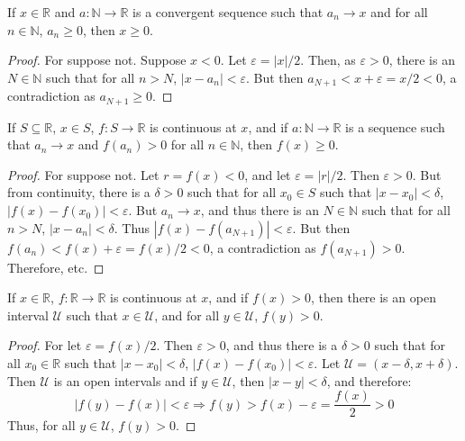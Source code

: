     \begin{theorem}
        If $x\in\mathbb{R}$ and $a:\mathbb{N}\rightarrow\mathbb{R}$ is a
        convergent sequence such that $a_{n}\rightarrow{x}$ and for all
        $n\in\mathbb{N}$, $a_{n}\geq{0}$, then $x\geq{0}$.
    \end{theorem}
    \begin{proof}
        For suppose not. Suppose $x<0$. Let $\varepsilon=|x|/2$. Then, as
        $\varepsilon>0$, there is an $N\in\mathbb{N}$ such that for all $n>N$,
        $|x-a_{n}|<\varepsilon$. But then $a_{N+1}<x+\varepsilon=x/2<0$, a
        contradiction as $a_{N+1}\geq{0}$.
    \end{proof}
    \begin{theorem}
        \label{thm:Continuous_Limit_of_Pos_Sequ_is_nonneg}
        If $S\subseteq\mathbb{R}$, $x\in{S}$, $f:S\rightarrow\mathbb{R}$ is
        continuous at $x$, and if $a:\mathbb{N}\rightarrow\mathbb{R}$ is a
        sequence such that  $a_{n}\rightarrow{x}$ and $f(a_{n})>0$
        for all $n\in\mathbb{N}$, then $f(x)\geq{0}$.
    \end{theorem}
    \begin{proof}
        For suppose not. Let $r=f(x)<0$, and let $\varepsilon=|r|/2$. Then
        $\varepsilon>0$. But from continuity, there is a $\delta>0$ such that
        for all $x_{0}\in{S}$ such that $|x-x_{0}|<\delta$,
        $|f(x)-f(x_{0})|<\varepsilon$. But $a_{n}\rightarrow{x}$, and thus
        there is an $N\in\mathbb{N}$ such that for all $n>N$,
        $|x-a_{n}|<\delta$. Thus $|f(x)-f(a_{N+1})|<\varepsilon$. But then
        $f(a_{n})<f(x)+\varepsilon=f(x)/2<0$, a contradiction as
        $f(a_{N+1})>0$. Therefore, etc.
    \end{proof}
    \begin{theorem}
        If $x\in\mathbb{R}$, $f:\mathbb{R}\rightarrow\mathbb{R}$ is continuous
        at $x$, and if $f(x)>0$, then there is an open interval $\mathcal{U}$
        such that $x\in\mathcal{U}$, and for all $y\in\mathcal{U}$, $f(y)>0$.
    \end{theorem}
    \begin{proof}
        For let $\varepsilon=f(x)/2$. Then $\varepsilon>0$, and thus there is a
        $\delta>0$ such that for all $x_{0}\in\mathbb{R}$ such that
        $|x-x_{0}|<\delta$, $|f(x)-f(x_{0})|<\varepsilon$. Let
        $\mathcal{U}=(x-\delta,x+\delta)$. Then $\mathcal{U}$ is an open
        intervals and if $y\in\mathcal{U}$, then $|x-y|<\delta$, and therefore:
        \begin{equation}
            |f(y)-f(x)|<\varepsilon
            \Rightarrow
            f(y)>f(x)-\varepsilon
            =\frac{f(x)}{2}>0
        \end{equation}
        Thus, for all $y\in\mathcal{U}$, $f(y)>0$.
    \end{proof}
